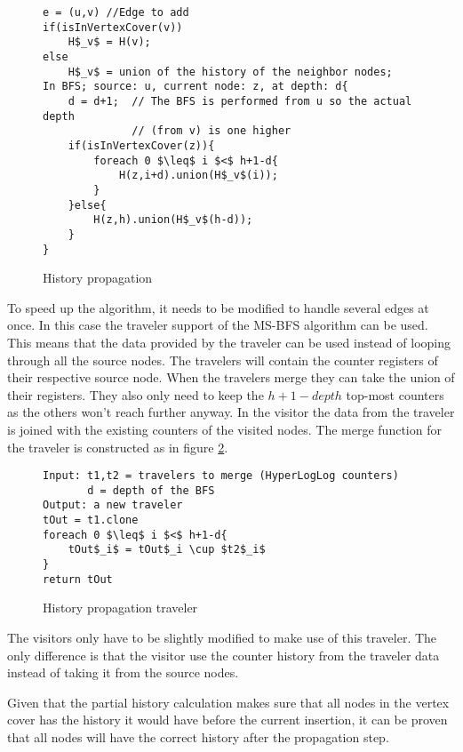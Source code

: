 \begin{figure}[h]
    \begin{lstlisting}[mathescape]
e = (u,v) //Edge to add
if(isInVertexCover(v))
    H$_v$ = H(v);
else
    H$_v$ = union of the history of the neighbor nodes;
In BFS; source: u, current node: z, at depth: d{
    d = d+1;  // The BFS is performed from u so the actual depth 
              // (from v) is one higher
    if(isInVertexCover(z)){
        foreach 0 $\leq$ i $<$ h+1-d{
            H(z,i+d).union(H$_v$(i));
        }
    }else{
        H(z,h).union(H$_v$(h-d));
    }
}
    \end{lstlisting}
    \caption{History propagation}
    \label{fig:history_propagation_algorithm}
\end{figure}

To speed up the algorithm, it needs to be modified to handle several edges at once. In this case the traveler support of the MS-BFS algorithm can be used. This means that the data provided by the traveler can be used instead of looping through all the source nodes. The travelers will contain the counter registers of their respective source node. When the travelers merge they can take the union of their registers. They also only need to keep the $h+1-depth$ top-most counters as the others won't reach further anyway. In the visitor the data from the traveler is joined with the existing counters of the visited nodes. The merge function for the traveler is constructed as in figure \ref{fig:history_propagation_traveler}.

\begin{figure}[h]
    \begin{lstlisting}[mathescape]
Input: t1,t2 = travelers to merge (HyperLogLog counters)
       d = depth of the BFS
Output: a new traveler
tOut = t1.clone
foreach 0 $\leq$ i $<$ h+1-d{
    tOut$_i$ = tOut$_i \cup $t2$_i$
}
return tOut
    \end{lstlisting}
    \caption{History propagation traveler}
    \label{fig:history_propagation_traveler}
\end{figure}

The visitors only have to be slightly modified to make use of this traveler. The only difference is that the visitor use the counter history from the traveler data instead of taking it from the source nodes.

Given that the partial history calculation makes sure that all nodes in the vertex cover has the history it would have before the current insertion, it can be proven that all nodes will have the correct history after the propagation step. \\

